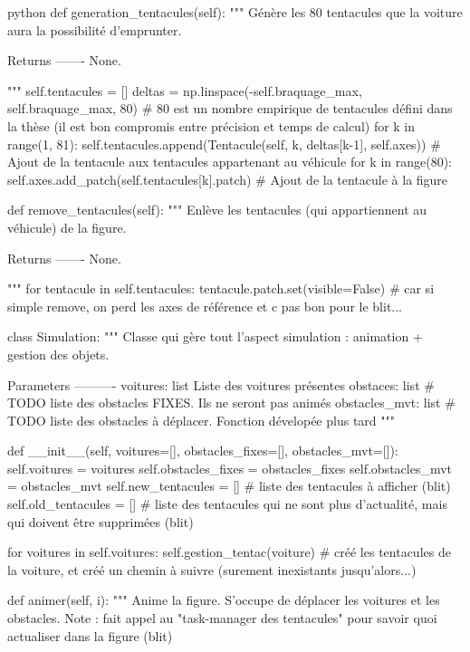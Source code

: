 \begin{mintedbox}{python}
    def generation_tentacules(self):
        """
        Génère les 80 tentacules que la voiture aura la possibilité d'emprunter.

        Returns
        -------
        None.

        """
        self.tentacules = []
        deltas = np.linspace(-self.braquage_max, self.braquage_max, 80)  # 80 est un nombre empirique de tentacules défini dans la thèse (il est bon compromis entre précision et temps de calcul)
        for k in range(1, 81):
            self.tentacules.append(Tentacule(self, k, deltas[k-1], self.axes))  # Ajout de la tentacule aux tentacules appartenant au véhicule
        for k in range(80):
            self.axes.add_patch(self.tentacules[k].patch)  # Ajout de la tentacule à la figure

    def remove_tentacules(self):
        """
        Enlève les tentacules (qui appartiennent au véhicule) de la figure.

        Returns
        -------
        None.

        """
        for tentacule in self.tentacules:
            tentacule.patch.set(visible=False)  # car si simple remove, on perd les axes de référence et c pas bon pour le blit...


class Simulation:
    """
    Classe qui gère tout l'aspect simulation : animation + gestion des objets.

    Parameters
    ----------
    voitures: list
        Liste des voitures présentes
    obstaces: list  # TODO
        liste des obstacles FIXES. Ils ne seront pas animés
    obstacles_mvt: list  # TODO
        liste des obstacles à déplacer. Fonction dévelopée plus tard
    """

    def __init__(self, voitures=[], obstacles_fixes=[], obstacles_mvt=[]):
        self.voitures = voitures
        self.obstacles_fixes = obstacles_fixes
        self.obstacles_mvt = obstacles_mvt
        self.new_tentacules = []  # liste des tentacules à afficher (blit)
        self.old_tentacules = []  # liste des tentacules qui ne sont plus d'actualité, mais qui doivent être supprimées (blit)

        for voitures in self.voitures:
            self.gestion_tentac(voiture)  # créé les tentacules de la voiture, et créé un chemin à suivre (surement inexistants jusqu'alors...)

    def animer(self, i):
        """
        Anime la figure. S'occupe de déplacer les voitures et les obstacles.
        Note : fait appel au "task-manager des tentacules" pour savoir quoi actualiser dans la figure (blit)


\end{mintedbox}
